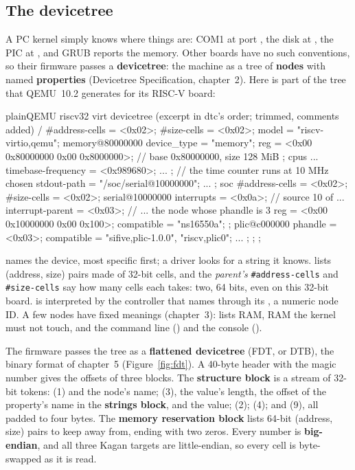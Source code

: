 \documentclass[11pt,a4paper]{article}
\begin{document}
\subsection{The devicetree}

A PC kernel simply knows where things are: COM1 at port , the disk at , the PIC at
, and GRUB reports the memory. Other boards have no such conventions, so their firmware passes a
\textbf{devicetree}: the machine as a tree of \textbf{nodes} with named \textbf{properties} (\SPEC Devicetree
Specification, chapter~2). Here is part of the tree that QEMU~10.2 generates for its RISC-V  board:

\begin{lst}{plain}{QEMU riscv32 virt devicetree (excerpt in dtc's order; trimmed, comments added)}
/ {
    #address-cells = <0x02>;
    #size-cells = <0x02>;
    model = "riscv-virtio,qemu";
    memory@80000000 {
        device_type = "memory";
        reg = <0x00 0x80000000 0x00 0x8000000>;   // base 0x80000000, size 128 MiB
    };
    cpus { ... timebase-frequency = <0x989680>; ... };   // the time counter runs at 10 MHz
    chosen { stdout-path = "/soc/serial@10000000"; ... };
    soc {
        #address-cells = <0x02>;
        #size-cells = <0x02>;
        serial@10000000 {
            interrupts = <0x0a>;                   // source 10 of ...
            interrupt-parent = <0x03>;             // ... the node whose phandle is 3
            reg = <0x00 0x10000000 0x00 0x100>;
            compatible = "ns16550a";
        };
        plic@c000000 { phandle = <0x03>; compatible = "sifive,plic-1.0.0", "riscv,plic0"; ... };
    };
};
\end{lst}

 names the device, most specific first; a driver looks for a string it knows.  lists
(address, size) pairs made of 32-bit cells, and the \emph{parent's} \texttt{\#address-cells} and \texttt{\#size-cells}
say how many cells each takes: two, 64 bits, even on this 32-bit board.  is interpreted by the
controller that  names through its , a numeric node ID. A few nodes have fixed
meanings (chapter~3):  lists RAM,  RAM the kernel must not touch, and
 the command line () and the console ().

The firmware passes the tree as a \textbf{flattened devicetree} (FDT, or DTB), the binary format of chapter~5
(Figure~\ref{fig:fdt}). A 40-byte header with the magic number  gives the offsets of three blocks.
The \textbf{structure block} is a stream of 32-bit tokens:  (1) and the node's name;
 (3), the value's length, the offset of the property's name in the \textbf{strings block}, and the
value;  (2);  (4); and  (9), all padded to four bytes. The
\textbf{memory reservation block} lists 64-bit (address, size) pairs to keep away from, ending with two zeros. Every
number is \textbf{big-endian}, and all three Kagan targets are little-endian, so every cell is byte-swapped as it is
read.
\end{document}
